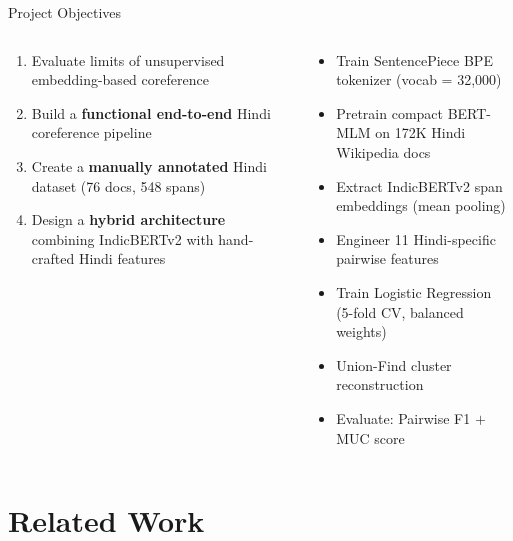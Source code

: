 \documentclass[aspectratio=169]{beamer}
\begin{document}
\begin{frame}{Project Objectives}
  \begin{columns}[T]
      \begin{tcolorbox}[nbox={Primary Objectives}]
        \small
        \begin{enumerate}\setlength\itemsep{5pt}
          \item Evaluate limits of unsupervised
                embedding-based coreference
          \item Build a \textbf{functional end-to-end}
                Hindi coreference pipeline
          \item Create a \textbf{manually annotated}
                Hindi dataset (76 docs, 548 spans)
          \item Design a \textbf{hybrid architecture}
                combining IndicBERTv2 with
                hand-crafted Hindi features
        \end{enumerate}
      \end{tcolorbox}

      \begin{tcolorbox}[nbox={Technical Objectives}]
        \small
        \begin{itemize}\setlength\itemsep{4pt}
          \item Train SentencePiece BPE tokenizer
                (vocab = 32,000)
          \item Pretrain compact BERT-MLM on
                172K Hindi Wikipedia docs
          \item Extract IndicBERTv2 span embeddings
                (mean pooling)
          \item Engineer 11 Hindi-specific pairwise features
          \item Train Logistic Regression (5-fold CV,
                balanced weights)
          \item Union-Find cluster reconstruction
          \item Evaluate: Pairwise F1 $+$ MUC score
        \end{itemize}
      \end{tcolorbox}
  \end{columns}
\end{frame}


\section{Related Work}
\end{document}
